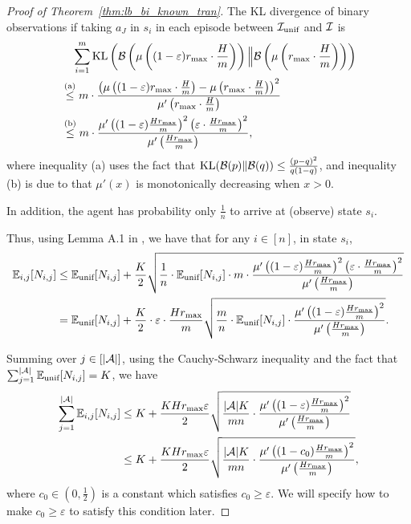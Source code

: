 \begin{proof}[Proof of Theorem~\ref{thm:lb_bi_known_tran}]
	The KL divergence of binary observations if taking $a_J$ in $s_i$ in each episode between $\mathcal{I}_{\textup{unif}}$ and $\mathcal{I}$ is
	\begin{align*}
		& \quad \sum_{i=1}^{m} \textup{KL} \left(  \mathcal{B}\left(  \mu\left( (1-\varepsilon) r_{\max} \cdot \frac{H}{m} \right)  \right) \Big\| \mathcal{B}\left(  \mu\left(  r_{\max} \cdot \frac{H}{m} \right)  \right)  \right) 
		\\
		&\overset{\textup{(a)}}{\leq} m \cdot \frac{ \left(  \mu\left( (1-\varepsilon) r_{\max} \cdot \frac{H}{m} \right) - \mu\left(  r_{\max} \cdot \frac{H}{m} \right)  \right)^2 }{ \mu'\left(  r_{\max} \cdot \frac{H}{m} \right) }
		\\
		&\overset{\textup{(b)}}{\leq} m \cdot \frac{ \mu'\left(  (1-\varepsilon) \frac{Hr_{\max}}{m}  \right)^2 \left( \varepsilon \cdot \frac{Hr_{\max}}{m} \right)^2  }{ \mu'\left(  \frac{Hr_{\max}}{m}  \right) } ,
	\end{align*}
	where inequality (a) uses the fact that $\textup{KL}(\mathcal{B}(p) \| \mathcal{B}(q)) \leq \frac{(p-q)^2}{q(1-q)}$, and inequality (b) is due to that $\mu'(x)$ is monotonically decreasing when $x > 0$.  
	
	In addition, the agent has probability only $\frac{1}{n}$ to arrive at (observe) state $s_i$.
	
	Thus, using Lemma A.1 in \cite{auer2002nonstochastic}, we have that for any $i \in [n]$, in state $s_i$,
	\begin{align*}
		\mathbb{E}_{i,j}[N_{i,j}] &\leq  \mathbb{E}_{\textup{unif}}[N_{i,j}] + \frac{K}{2} \sqrt{ \frac{1}{n} \cdot \mathbb{E}_{\textup{unif}}[N_{i,j}] \cdot m \cdot \frac{ \mu'\left(  (1-\varepsilon) \frac{Hr_{\max}}{m}  \right)^2 \left( \varepsilon \cdot \frac{Hr_{\max}}{m} \right)^2  }{ \mu'\left(  \frac{Hr_{\max}}{m}  \right) } } 
		\\
		&=  \mathbb{E}_{\textup{unif}}[N_{i,j}] + \frac{K}{2} \cdot \varepsilon \cdot \frac{Hr_{\max}}{m} \sqrt{ \frac{m}{n} \cdot \mathbb{E}_{\textup{unif}}[N_{i,j}] \cdot \frac{ \mu'\left(  (1-\varepsilon) \frac{Hr_{\max}}{m}  \right)^2 }{ \mu'\left(  \frac{Hr_{\max}}{m}  \right) } } .
	\end{align*}
	
	Summing over $j \in [|\mathcal{A}|]$, using the Cauchy-Schwarz inequality and the fact that $\sum_{j=1}^{|\mathcal{A}|} \mathbb{E}_{\textup{unif}}[N_{i,j}]=K$, we have
	\begin{align*}
		\sum_{j=1}^{|\mathcal{A}|}  \mathbb{E}_{i,j}[N_{i,j}] &\leq K + \frac{K Hr_{\max} \varepsilon}{2} \sqrt{ \frac{|\mathcal{A}|  K}{m n} \cdot \frac{ \mu'\left(  (1-\varepsilon) \frac{Hr_{\max}}{m}  \right)^2 }{ \mu'\left(  \frac{Hr_{\max}}{m}  \right) } } 
		\\
		&\leq K + \frac{K Hr_{\max} \varepsilon}{2}  \sqrt{ \frac{|\mathcal{A}| K}{m n} \cdot \frac{ \mu'\left(  (1-c_0) \frac{Hr_{\max}}{m}  \right)^2 }{ \mu'\left(  \frac{Hr_{\max}}{m}  \right) } }  ,
	\end{align*}
	where $c_0 \in (0,\frac{1}{2})$ is a constant which satisfies $c_0 \geq \varepsilon$. We will specify how to make $c_0 \geq \varepsilon$ to satisfy this condition later.
	

\end{proof}
